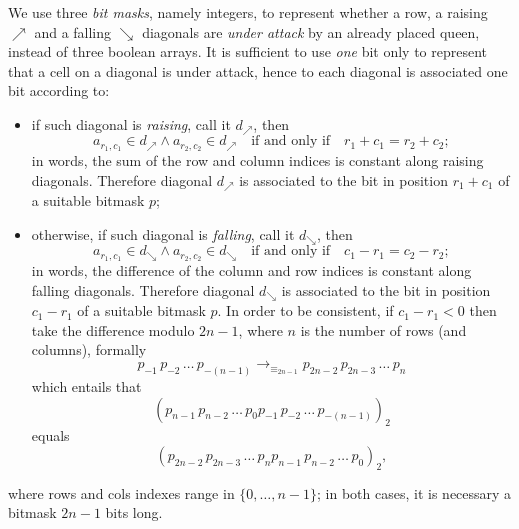 We use three \textit{bit masks}, namely integers, to represent whether a row, a
raising $\nearrow$ and a falling $\searrow$ diagonals are \textit{under attack}
by an already placed queen, instead of three boolean arrays.  It is sufficient
to use \textit{one} bit only to represent that a cell on a diagonal is under
attack, hence to each diagonal is associated one bit according to:
\begin{itemize}
\item if such diagonal is \textit{raising}, call it $d_\nearrow$, then
  \begin{displaymath}
    a_{r_{1}, c_{1}}\in d_\nearrow \wedge a_{r_{2}, c_{2}} \in d_\nearrow
    \quad\text{if and only if}\quad r_{1}+c_{1}=r_{2}+c_{2};
  \end{displaymath}
  in words, the sum of the row and column indices is
  constant along raising diagonals. Therefore diagonal $d_\nearrow$ is
  associated to the bit in position $r_{1}+c_{1}$ of a suitable bitmask $p$;
\item otherwise, if such diagonal is \textit{falling}, call it $d_\searrow$, then
  \begin{displaymath}
    a_{r_{1}, c_{1}}\in d_\searrow \wedge a_{r_{2}, c_{2}} \in d_\searrow
    \quad\text{if and only if}\quad c_{1}-r_{1}=c_{2}-r_{2};
  \end{displaymath}
  in words, the difference of the column and row
  indices is constant along falling diagonals. Therefore diagonal $d_\searrow$
  is associated to the bit in position  $c_{1}-r_{1}$ of a suitable bitmask $p$.
  In order to be consistent, if $c_{1}-r_{1} < 0$ then take the difference modulo
  $2n-1$, where $n$ is the number of rows (and columns), formally
  \begin{displaymath}
  p_{-1}\,p_{-2}\,\ldots\,p_{-(n-1)} \rightarrow_{\equiv_{2n-1}}
  p_{2n-2}\,p_{2n-3}\,\ldots\,p_{n}
  \end{displaymath}
  which entails that
  \begin{displaymath}
  \left(p_{n-1}\,p_{n-2}\,\ldots\,p_{0}p_{-1}\,p_{-2}\,\ldots\,p_{-(n-1)}\right)_{2}
  \end{displaymath}
  equals
  \begin{displaymath}
  \left(p_{2n-2}\,p_{2n-3}\,\ldots\,p_{n}p_{n-1}\,p_{n-2}\,\ldots\,p_{0}\right)_{2},
  \end{displaymath}
\end{itemize}
where rows and cols indexes range in $\lbrace 0,\ldots,n-1 \rbrace$; in both
cases, it is necessary a bitmask $2n-1$ bits long. 

